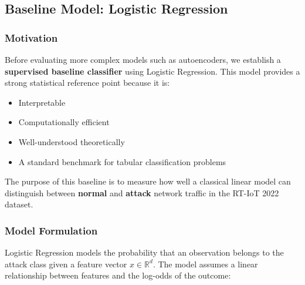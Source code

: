 \documentclass[
  letterpaper,
  DIV=11,
  numbers=noendperiod]{scrartcl}
\providecommand{\tightlist}{%
  \setlength{\itemsep}{0pt}\setlength{\parskip}{0pt}}
\begin{document}
\begin{table}[H]

\caption{\label{tbl-rtiot-lr-split}Train/test split distribution for
target (balanced dataset)}


\end{table}%

\subsection{Baseline Model: Logistic
Regression}\label{baseline-model-logistic-regression}

\subsubsection{Motivation}\label{motivation}

Before evaluating more complex models such as autoencoders, we establish
a \textbf{supervised baseline classifier} using Logistic Regression.
This model provides a strong statistical reference point because it is:

\begin{itemize}
\tightlist
\item
  Interpretable
\item
  Computationally efficient
\item
  Well-understood theoretically
\item
  A standard benchmark for tabular classification problems
\end{itemize}

The purpose of this baseline is to measure how well a classical linear
model can distinguish between \textbf{normal} and \textbf{attack}
network traffic in the RT-IoT 2022 dataset.

\subsubsection{Model Formulation}\label{model-formulation}

Logistic Regression models the probability that an observation belongs
to the attack class given a feature vector \(x \in \mathbb{R}^d\). The
model assumes a linear relationship between features and the log-odds of
the outcome:
\end{document}
